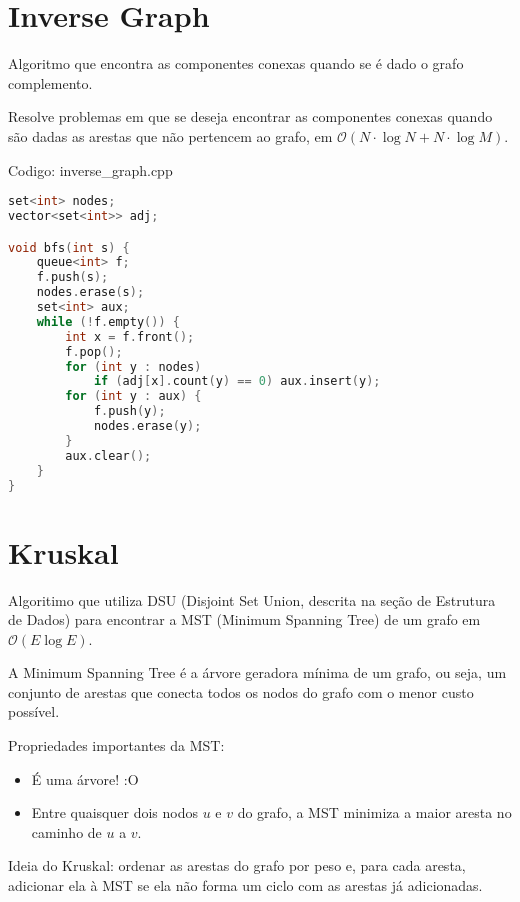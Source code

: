 \documentclass[10pt, a4paper, oneside]{book}
\begin{document}
\hfill

\section{Inverse Graph}


Algoritmo que encontra as componentes conexas quando se é dado o grafo complemento.



Resolve problemas em que se deseja encontrar as componentes conexas quando são dadas as arestas que não pertencem ao grafo, em $\mathcal{O}(N \cdot \log N + N \cdot \log M)$.
\hfill

Codigo: inverse\_graph.cpp

\begin{lstlisting}[language=C++]
set<int> nodes;
vector<set<int>> adj;

void bfs(int s) {
    queue<int> f;
    f.push(s);
    nodes.erase(s);
    set<int> aux;
    while (!f.empty()) {
        int x = f.front();
        f.pop();
        for (int y : nodes)
            if (adj[x].count(y) == 0) aux.insert(y);
        for (int y : aux) {
            f.push(y);
            nodes.erase(y);
        }
        aux.clear();
    }
}
\end{lstlisting}
\hfill

\section{Kruskal}


Algoritimo que utiliza DSU (Disjoint Set Union, descrita na seção de Estrutura de Dados) para encontrar a MST (Minimum Spanning Tree) de um grafo em $\mathcal{O}(E \log E)$.



A Minimum Spanning Tree é a árvore geradora mínima de um grafo, ou seja, um conjunto de arestas que conecta todos os nodos do grafo com o menor custo possível.



Propriedades importantes da MST:



\begin{itemize}
\item É uma árvore! :O
\item Entre quaisquer dois nodos $u$ e $v$ do grafo, a MST minimiza a maior aresta no caminho de $u$ a $v$.
\end{itemize}



Ideia do Kruskal: ordenar as arestas do grafo por peso e, para cada aresta, adicionar ela à MST se ela não forma um ciclo com as arestas já adicionadas.
\hfill
\end{document}

